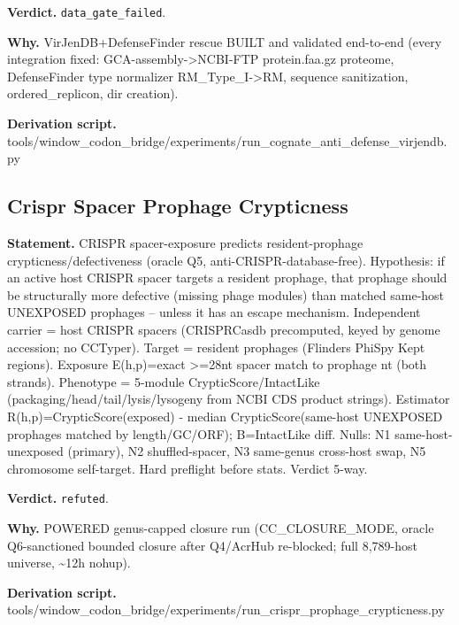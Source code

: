 \textbf{Verdict.} \texttt{data\_gate\_failed}.

\textbf{Why.} VirJenDB+DefenseFinder rescue BUILT and validated end-to-end (every integration fixed:
GCA-assembly->NCBI-FTP protein.faa.gz proteome, DefenseFinder type normalizer RM\_Type\_I->RM,
sequence sanitization, ordered\_replicon, dir creation).

\textbf{Derivation script.} tools/window\_codon\_bridge/experiments/run\_cognate\_anti\_defense\_virjendb.py

\subsection{Crispr Spacer Prophage Crypticness}\label{sec:bridge-crispr-spacer-prophage-crypticness}
\textbf{Statement.} CRISPR spacer-exposure predicts resident-prophage crypticness/defectiveness (oracle Q5,
anti-CRISPR-database-free). Hypothesis: if an active host CRISPR spacer targets a resident prophage,
that prophage should be structurally more defective (missing phage modules) than matched same-host
UNEXPOSED prophages -- unless it has an escape mechanism. Independent carrier = host CRISPR spacers
(CRISPRCasdb precomputed, keyed by genome accession; no CCTyper). Target = resident prophages
(Flinders PhiSpy Kept regions). Exposure E(h,p)=exact >=28nt spacer match to prophage nt (both
strands). Phenotype = 5-module CrypticScore/IntactLike (packaging/head/tail/lysis/lysogeny from NCBI
CDS product strings). Estimator R(h,p)=CrypticScore(exposed) - median CrypticScore(same-host
UNEXPOSED prophages matched by length/GC/ORF); B=IntactLike diff. Nulls: N1 same-host-unexposed
(primary), N2 shuffled-spacer, N3 same-genus cross-host swap, N5 chromosome self-target. Hard
preflight before stats. Verdict 5-way.

\textbf{Verdict.} \texttt{refuted}.

\textbf{Why.} POWERED genus-capped closure run (CC\_CLOSURE\_MODE, oracle Q6-sanctioned bounded closure after
Q4/AcrHub re-blocked; full 8,789-host universe, \textasciitilde{}12h nohup).

\textbf{Derivation script.} tools/window\_codon\_bridge/experiments/run\_crispr\_prophage\_crypticness.py

